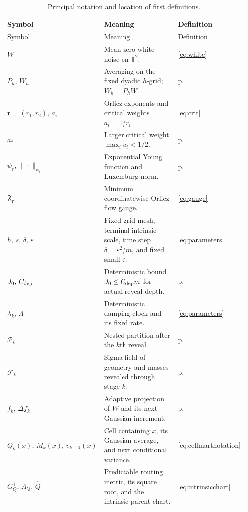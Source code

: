 \documentclass[11pt]{article}
\theoremstyle{definition}
\theoremstyle{remark}
\numberwithin{equation}{section}
\newcommand{\T}{\mathbb T}
\newcommand{\F}{\mathcal F}
\newcommand{\pr}{\mathcal P}
\begin{document}
{\small
\setlength{\tabcolsep}{4pt}
\renewcommand{\arraystretch}{1.12}
\begin{longtable}{@{}p{0.285\linewidth}p{0.535\linewidth}p{0.14\linewidth}@{}}
\caption{Principal notation and location of first definitions.}\label{tab:notation}\\
\toprule
Symbol & Meaning & Definition \\
\midrule
\endfirsthead
\toprule
Symbol & Meaning & Definition \\
\midrule
\endhead
\bottomrule
\endfoot
$W$ & Mean-zero white noise on $\T^2$. & \eqref{eq:white}\\
$P_h,\,W_h$ & Averaging on the fixed dyadic $h$-grid; $W_h=P_hW$. & p.~\pageref{not:fixedgrid}\\
$\boldsymbol r=(r_1,r_2),\,a_i$ & Orlicz exponents and critical weights $a_i=1/r_i$. & \eqref{eq:crit}\\
$a_*$ & Larger critical weight $\max_i a_i<1/2$. & p.~\pageref{not:astar}\\
$\psi_r,\,\|\cdot\|_{\psi_r}$ & Exponential Young function and Luxemburg norm. & p.~\pageref{not:orlicz}\\
$\mathfrak F_{\boldsymbol r}$ & Minimum coordinatewise Orlicz flow gauge. & \eqref{eq:gauge}\\
$h,\,s,\,\delta,\,\varepsilon$ & Fixed-grid mesh, terminal intrinsic scale, time step $\delta=\varepsilon^2/m$, and fixed small $\varepsilon$. & \eqref{eq:parameters}\\
$J_0,\,C_{\rm dep}$ & Deterministic bound $J_0\le C_{\rm dep}m$ for actual reveal depth. & p.~\pageref{not:depthbound}\\
$\lambda_k,\,\Lambda$ & Deterministic damping clock and its fixed rate. & \eqref{eq:parameters}\\
$\pr_k$ & Nested partition after the $k$th reveal. & p.~\pageref{not:predictabletree}\\
$\F_k$ & Sigma-field of geometry and masses revealed through stage $k$. & p.~\pageref{not:revealedfiltration}\\
$f_k,\,\Delta f_k$ & Adaptive projection of $W$ and its next Gaussian increment. & p.~\pageref{not:adaptiveprojection}\\
$Q_k(x),\,M_k(x),\,v_{k+1}(x)$ & Cell containing $x$, its Gaussian average, and next conditional variance. & \eqref{eq:cellmartnotation}\\
$G_Q^+,\,A_Q,\,\widehat Q$ & Predictable routing metric, its square root, and the intrinsic parent chart. & \eqref{eq:intrinsicchart}\\

\end{longtable}}
\end{document}
